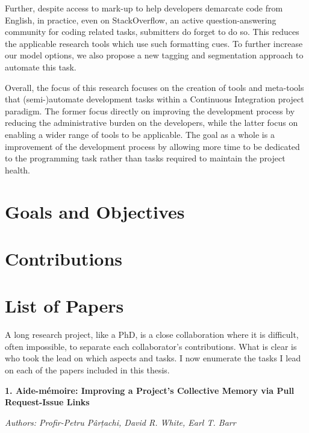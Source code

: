 Further, despite access to mark-up to help developers demarcate code from
English, in practice, even on StackOverflow, an active question-answering
community for coding related tasks, submitters do forget to do so. This reduces
the applicable research tools which use such formatting cues. To further
increase our model options, we also propose a new tagging and segmentation
approach to automate this task.

Overall, the focus of this research focuses on the creation of tools and
meta-tools that (semi-)automate development tasks within a Continuous
Integration project paradigm. The former focus directly on improving the
development process by reducing the administrative burden on the developers,
while the latter focus on enabling a wider range of tools to be applicable. The
goal as a whole is a improvement of the development process by allowing more
time to be dedicated to the programming task rather than tasks required to
maintain the project health.

\section{Goals and Objectives}
\label{chapter:introduction:sec:goals}


\section{Contributions}
\label{chapter:introduction:sec:contrib}


\section{List of Papers}
\label{chapter:introduction:sec:papers}

A long research project, like a PhD, is a close collaboration where it is
difficult, often impossible, to separate each collaborator's contributions.
What is clear is who took the lead on which aspects and tasks.  I now enumerate
the tasks I lead on each of the papers included in this thesis.

\noindent\textbf{1. Aide-mémoire: Improving a Project’s Collective Memory via Pull
Request-Issue Links} 

\noindent\emph{Authors: Profir-Petru Pârțachi, David R. White, Earl T. Barr}

